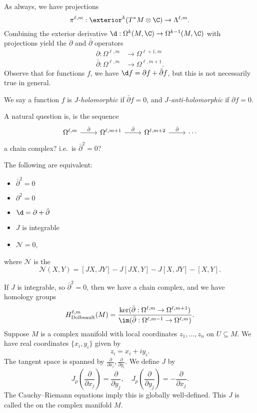 \documentclass[a4paper]{article}
\newcommand\Dolb{\mathrm{Dolbeault}}
\begin{document}
As always, we have projections
\[
  \pi^{\ell, m}: \exterior^k (T^*M \otimes \C ) \to \Lambda^{\ell, m}.
\]
Combining the exterior derivative $\d: \Omega^k(M, \C) \to \Omega^{k - 1}(M, \C)$ with projections yield the $\partial$ and $\bar{\partial}$ operators
\begin{align*}
  \partial: \Omega^{\ell, m} &\to \Omega^{\ell + 1, m}\\
  \bar{\partial}: \Omega^{\ell, m} &\to \Omega^{\ell, m + 1}.
\end{align*}
Observe that for functions $f$, we have $\d f = \partial f + \bar{\partial} f$, but this is not necessarily true in general.

\begin{defi}[$J$-holomorphic]
  We say a function $f$ is \emph{$J$-holomorphic} if $\bar{\partial} f = 0$, and \emph{$J$-anti-holomorphic} if $\partial f = 0$.
\end{defi}

A natural question is, is the sequence
\[
  \begin{tikzcd}
    \Omega^{\ell, m} \ar[r, "\bar{\partial}"] &
    \Omega^{\ell, m + 1} \ar[r, "\bar{\partial}"] &
    \Omega^{\ell, m + 2} \ar[r, "\bar{\partial}"] &
    \cdots
  \end{tikzcd}
\]
a chain complex? i.e.\ is $\bar{\partial}^2 = 0$?
\begin{thm}
  The following are equivalent:
  \begin{itemize}
    \item $\bar{\partial}^2 = 0$
    \item $\partial^2 = 0$
    \item $\d = \partial + \bar{\partial}$
    \item $J$ is integrable
    \item $\mathcal{N} = 0$,
  \end{itemize}
  where $\mathcal{N}$ is the 
  \[
    \mathcal{N}(X, Y) = [JX, JY] - J[JX, Y] - J[X, JY] - [X, Y].
  \]
\end{thm}
If $J$ is integrable, so $\bar{\partial}^2 = 0$, then we have a chain complex, and we have homology groups
\[
  H^{\ell, m}_{\Dolb} (M) = \frac{\ker(\bar{\partial}: \Omega^{\ell, m} \to \Omega^{\ell, m + 1})}{\im (\bar{\partial}: \Omega^{\ell, m - 1} \to \Omega^{\ell, m})}.
\]
Suppose $M$ is a complex manifold with local coordinates $z_1, \ldots, z_n$ on $U \subseteq M$. We have real coordinates $\{x_i, y_i\}$ given by
\[
  z_i = x_i + i y_i.
\]
The tangent space is spanned by $\frac{\partial}{\partial x_i}, \frac{\partial }{\partial y_i}$. We define $J$ by
\[
  J_p\left(\frac{\partial}{\partial x_j}\right) = \frac{\partial}{\partial y_j},\quad J_p\left(\frac{\partial}{\partial y_j}\right) = - \frac{\partial}{\partial x_j}.
\]
The Cauchy--Riemann equations imply this is globally well-defined. This $J$ is called the  on the complex manifold $M$.
\end{document}
